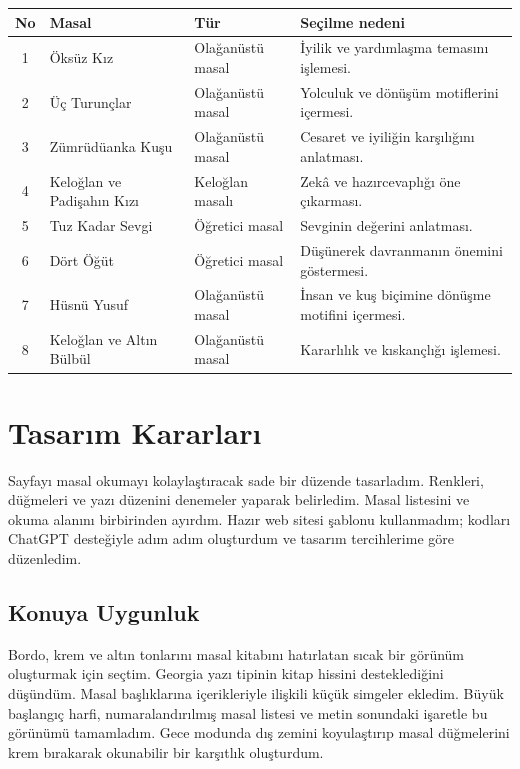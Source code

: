\documentclass[12pt,a4paper]{article}
\begin{document}
\begin{longtable}{@{}cp{4cm}p{3cm}p{5.4cm}@{}}
\toprule
\textbf{No} & \textbf{Masal} & \textbf{Tür} & \textbf{Seçilme nedeni} \\
\midrule
\endhead
1 & Öksüz Kız & Olağanüstü masal & İyilik ve yardımlaşma temasını işlemesi. \tabularnewline
2 & Üç Turunçlar & Olağanüstü masal & Yolculuk ve dönüşüm motiflerini içermesi. \tabularnewline
3 & Zümrüdüanka Kuşu & Olağanüstü masal & Cesaret ve iyiliğin karşılığını anlatması. \tabularnewline
4 & Keloğlan ve Padişahın Kızı & Keloğlan masalı & Zekâ ve hazırcevaplığı öne çıkarması. \tabularnewline
5 & Tuz Kadar Sevgi & Öğretici masal & Sevginin değerini anlatması. \tabularnewline
6 & Dört Öğüt & Öğretici masal & Düşünerek davranmanın önemini göstermesi. \tabularnewline
7 & Hüsnü Yusuf & Olağanüstü masal & İnsan ve kuş biçimine dönüşme motifini içermesi. \tabularnewline
8 & Keloğlan ve Altın Bülbül & Olağanüstü masal & Kararlılık ve kıskançlığı işlemesi. \tabularnewline

\end{longtable}

\section{Tasarım Kararları}
Sayfayı masal okumayı kolaylaştıracak sade bir düzende tasarladım. Renkleri, düğmeleri ve yazı düzenini denemeler yaparak belirledim. Masal listesini ve okuma alanını birbirinden ayırdım. Hazır web sitesi şablonu kullanmadım; kodları ChatGPT desteğiyle adım adım oluşturdum ve tasarım tercihlerime göre düzenledim.

\subsection{Konuya Uygunluk}
Bordo, krem ve altın tonlarını masal kitabını hatırlatan sıcak bir görünüm oluşturmak için seçtim. Georgia yazı tipinin kitap hissini desteklediğini düşündüm. Masal başlıklarına içerikleriyle ilişkili küçük simgeler ekledim. Büyük başlangıç harfi, numaralandırılmış masal listesi ve metin sonundaki işaretle bu görünümü tamamladım. Gece modunda dış zemini koyulaştırıp masal düğmelerini krem bırakarak okunabilir bir karşıtlık oluşturdum.
\end{document}
